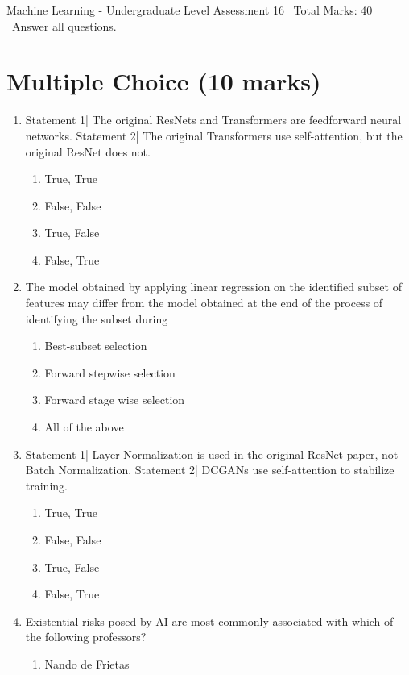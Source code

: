 \documentclass[12pt]{article}
\begin{document}
\begin{center}
Machine Learning - Undergraduate Level Assessment 16 \
Total Marks: 40 \
Answer all questions.
\end{center}

\section*{Multiple Choice (10 marks)}
\begin{enumerate}[label=\arabic*.]
\item Statement 1| The original ResNets and Transformers are feedforward neural networks. Statement 2| The original Transformers use self-attention, but the original ResNet does not.
\begin{enumerate}[label=(\alph*)]
    \item True, True
    \item False, False
    \item True, False
    \item False, True
\end{enumerate}
\item The model obtained by applying linear regression on the identified subset of features may differ from the model obtained at the end of the process of identifying the subset during
\begin{enumerate}[label=(\alph*)]
    \item Best-subset selection
    \item Forward stepwise selection
    \item Forward stage wise selection
    \item All of the above
\end{enumerate}
\item Statement 1| Layer Normalization is used in the original ResNet paper, not Batch Normalization. Statement 2| DCGANs use self-attention to stabilize training.
\begin{enumerate}[label=(\alph*)]
    \item True, True
    \item False, False
    \item True, False
    \item False, True
\end{enumerate}
\item Existential risks posed by AI are most commonly associated with which of the following professors?
\begin{enumerate}[label=(\alph*)]
    \item Nando de Frietas

\end{enumerate}
\end{enumerate}
\end{document}

